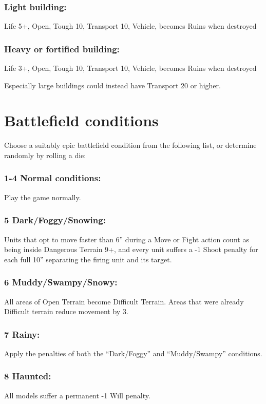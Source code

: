 \begin{multicols}{2}
\subsubsection*{Light building:} Life 5+, Open, Tough 10, Transport 10, Vehicle, becomes Ruins when destroyed

\subsubsection*{Heavy or fortified building:} Life 3+, Open, Tough 10, Transport 10, Vehicle, becomes Ruins when destroyed

Especially large buildings could instead have Transport 20 or higher.




\section*{Battlefield conditions}
Choose a suitably epic battlefield condition from the following list, or determine randomly by rolling a die:

\subsubsection*{1-4 Normal conditions:} Play the game normally.

\subsubsection*{5 Dark/Foggy/Snowing:} Units that opt to move faster than 6'' during a Move or Fight action count as being inside Dangerous Terrain 9+, and every unit suffers a -1 Shoot penalty for each full 10'' separating the firing unit and its target.

\subsubsection*{6 Muddy/Swampy/Snowy:} All areas of Open Terrain become Difficult Terrain. Areas that were already Difficult terrain reduce movement by 3.

\subsubsection*{7 Rainy:} Apply the penalties of both the ``Dark/Foggy'' and ``Muddy/Swampy'' conditions.

\subsubsection*{8 Haunted:} All models suffer a permanent -1 Will penalty.


\end{multicols}
